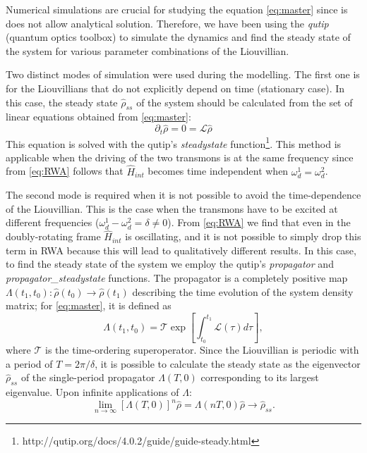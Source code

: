 \documentclass[%
 aip,
 amsmath,amssymb,
 reprint,%
]{revtex4-1}
\begin{document}
Numerical simulations are crucial for studying the equation \eqref{eq:master} since is does not allow  analytical solution. Therefore, we have been using the \textit{qutip}\cite{johansson2013qutip} (quantum optics toolbox) to simulate the dynamics and find the steady state of the system for various parameter combinations of the Liouvillian.

Two distinct modes of simulation were used during the modelling. The first one is for the Liouvillians that do not explicitly depend on time (stationary case). In this case, the steady state $\hat \rho_{ss}$ of the system should be calculated from the set of linear equations obtained from \eqref{eq:master}:
\begin{equation}
\partial_t \hat \rho = 0 = \mathcal{L} \hat \rho
\end{equation}
This equation is solved with the qutip's \textit{steadystate} function\footnote{http://qutip.org/docs/4.0.2/guide/guide-steady.html}. This method is applicable when the driving of the two transmons is at the same frequency since from \eqref{eq:RWA} follows that $\hat H_{int}$ becomes time independent when $\omega_d^1 = \omega_d^2$.

The second mode is required when it is not possible to avoid the time-dependence of the Liouvillian. This is the case when the transmons have to be excited at different frequencies ($\omega_d^1 - \omega_d^2 = \delta \neq 0$). From \eqref{eq:RWA} we find that even in the doubly-rotating frame $\hat H_{int}$ is oscillating, and it is not possible to simply drop this term in RWA because this will lead to qualitatively different results. In this case, to find the steady state of the system we employ the qutip's \textit{propagator} and \textit{propagator\_steadystate} functions. The propagator is a completely positive map $\Lambda(t_1, t_0): \hat \rho(t_0) \rightarrow \hat \rho(t_1)$ describing the time evolution of the system density matrix; for \eqref{eq:master}, it is defined as
\begin{equation}
\Lambda(t_1, t_0) = \mathcal{T} \exp [\int_{t_0}^{t_1} \mathcal L(\tau) d\tau],
\end{equation}
where $\mathcal T$ is the time-ordering superoperator. Since the Liouvillian is periodic with a period of $T = 2\pi/\delta$, it is possible to calculate the steady state as the eigenvector $\hat \rho_{ss}$ of the single-period propagator $\Lambda(T, 0)$ corresponding to its largest eigenvalue\cite{dittrich1998quantum, rivas2012open}. Upon infinite applications of $\Lambda$: 
\[
\lim_{n\to \infty} \left[\Lambda(T, 0)\right]^n \hat \rho = \Lambda(nT, 0) \hat \rho \to \hat \rho_{ss}.
\]
\end{document}

